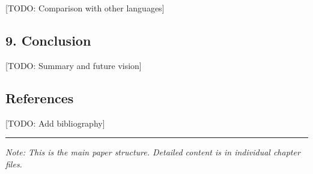 \documentclass[
]{article}
\begin{document}
{[}TODO: Comparison with other languages{]}

\hypertarget{conclusion}{%
\subsection{9. Conclusion}\label{conclusion}}

{[}TODO: Summary and future vision{]}

\hypertarget{references}{%
\subsection{References}\label{references}}

{[}TODO: Add bibliography{]}

\begin{center}\rule{0.5\linewidth}{0.5pt}\end{center}

\emph{Note: This is the main paper structure. Detailed content is in
individual chapter files.}
\end{document}

